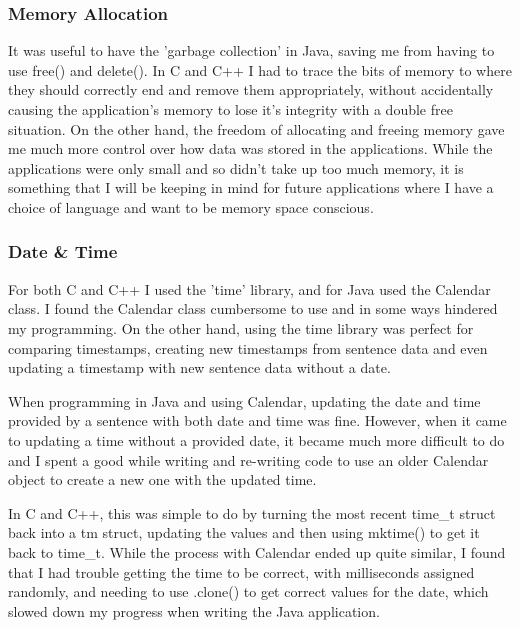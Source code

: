\documentclass{article}
\begin{document}
\subsubsection{Memory Allocation}

It was useful to have the 'garbage collection' in Java, saving me from having to use free() and delete(). In C and C++ I had to trace the bits of memory to where they should correctly end and remove them appropriately, without accidentally causing the application's memory to lose it's integrity with a double free situation. On the other hand, the freedom of allocating and freeing memory gave me much more control over how data was stored in the applications. While the applications were only small and so didn't take up too much memory, it is something that I will be keeping in mind for future applications where I have a choice of language and want to be memory space conscious.

\subsubsection{Date \& Time}

For both C and C++ I used the 'time' library\cite{time}, and for Java used the Calendar\cite{calendar} class. I found the Calendar class cumbersome to use and in some ways hindered my programming. On the other hand, using the time library was perfect for comparing timestamps, creating new timestamps from sentence data and even updating a timestamp with new sentence data without a date. 

When programming in Java and using Calendar, updating the date and time provided by a sentence with both date and time was fine. However, when it came to updating a time without a provided date, it became much more difficult to do and I spent a good while writing and re-writing code to use an older Calendar object to create a new one with the updated time.

In C and C++, this was simple to do by turning the most recent time\_t struct back into a tm struct, updating the values and then using mktime() to get it back to time\_t. While the process with Calendar ended up quite similar, I found that I had trouble getting the time to be correct, with milliseconds assigned randomly, and needing to use .clone() to get correct values for the date, which slowed down my progress when writing the Java application.




\end{document}
